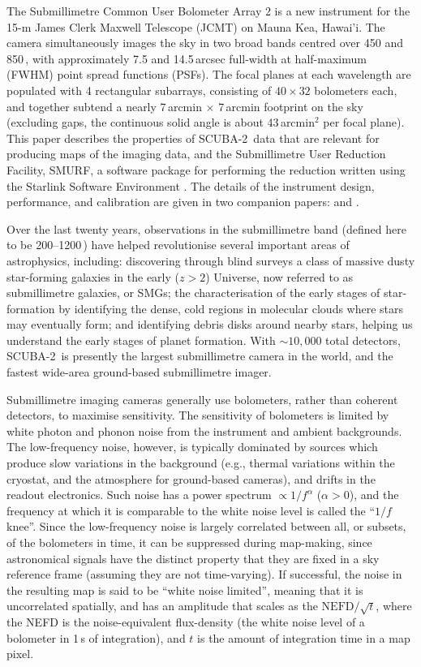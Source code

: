 \documentclass[useAMS,usenatbib,nofootinbib]{mn2e}
\newcommand{\scuba}{SCUBA-2}
\begin{document}
The Submillimetre Common User Bolometer Array 2
\citep[\scuba,][]{holland2012} is a new instrument for the 15-m James
Clerk Maxwell Telescope (JCMT) on Mauna Kea, Hawai'i. The camera
simultaneously images the sky in two broad bands centred over 450 and
850\,\micron, with approximately 7.5 and 14.5\,arcsec full-width at
half-maximum (FWHM) point spread functions (PSFs). The focal planes at
each wavelength are populated with 4 rectangular subarrays, consisting
of $40 \times 32$ bolometers each, and together subtend a nearly
7\,arcmin $\times$ 7\,arcmin footprint on the sky (excluding gaps, the
continuous solid angle is about 43\,arcmin$^{2}$ per focal plane).
This paper describes the properties of \scuba\ data that are relevant
for producing maps of the imaging data, and the Submillimetre User
Reduction Facility, SMURF, a software package for performing the
reduction written using the Starlink Software Environment
\citep{1993ASPC...52..229W,2009ASPC..411..418J}. The details of the instrument design,
performance, and calibration are given in two companion papers:
\citet{holland2012} and \citet{dempsey2012}.

Over the last twenty years, observations in the submillimetre band
(defined here to be 200--1200\,\micron) have helped revolutionise
several important areas of astrophysics, including: discovering
through blind surveys a class of massive dusty star-forming galaxies
in the early ($z>2$) Universe, now referred to as submillimetre
galaxies, or SMGs; the characterisation of the early stages of
star-formation by identifying the dense, cold regions in molecular
clouds where stars may eventually form; and identifying debris disks
around nearby stars, helping us understand the early stages of planet
formation.  With $\sim10,000$ total detectors, \scuba\ is presently
the largest submillimetre camera in the world, and the fastest
wide-area ground-based submillimetre imager.

Submillimetre imaging cameras generally use bolometers, rather than
coherent detectors, to maximise sensitivity. The sensitivity of
bolometers is limited by white photon and phonon noise from the
instrument and ambient backgrounds. The low-frequency noise, however,
is typically dominated by sources which produce slow variations in the
background (e.g., thermal variations within the cryostat, and the
atmosphere for ground-based cameras), and drifts in the readout
electronics. Such noise has a power spectrum $\propto 1/f^\alpha$
($\alpha>0$), and the frequency at which it is comparable to the white
noise level is called the ``$1/f$ knee''. Since the low-frequency
noise is largely correlated between all, or subsets, of the bolometers
in time, it can be suppressed during map-making, since astronomical
signals have the distinct property that they are fixed in a sky
reference frame (assuming they are not time-varying). If successful,
the noise in the resulting map is said to be ``white noise limited'',
meaning that it is uncorrelated spatially, and has an amplitude that
scales as the $\mathrm{NEFD}/\sqrt{t}$, where the NEFD is the
noise-equivalent flux-density (the white noise level of a bolometer in
1\,s of integration), and $t$ is the amount of integration time in a
map pixel.
\end{document}
